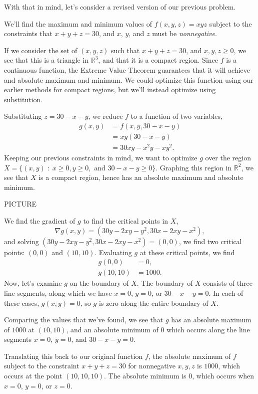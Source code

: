 \documentclass{ximera}
\begin{document}
With that in mind, let's consider a revised version of our previous problem.

\begin{example}
We'll find the maximum and minimum values of $f(x,y,z) = xyz$ subject to the constraints that $x+y+z=30$, and $x$, $y$, and $z$ must be \emph{nonnegative}.

If we consider the set of $(x,y,z)$ such that $x+y+z=30$, and $x,y,z\geq 0$, we see that this is a triangle in $\mathbb{R}^3$, and that it is a compact region. Since $f$ is a continuous function, the Extreme Value Theorem guarantees that it will achieve and absolute maximum and minimum. We could optimize this function using our earlier methods for compact regions, but we'll instead optimize using substitution.

Substituting $z = 30-x-y$, we reduce $f$ to a function of two variables,
\begin{align*}
g(x,y) &= f(x,y,30-x-y)\\
&= xy(30-x-y)\\
&= 30xy-x^2y-xy^2.
\end{align*}
Keeping our previous constraints in mind, we want to optimize $g$ over the region $X = \{(x,y)\;:\;x\geq 0, y\geq 0, \text{ and } 30-x-y\geq 0\}$. Graphing this region in $\mathbb{R}^2$, we see that $X$ is a compact region, hence has an absolute maximum and absolute minimum.

PICTURE

We find the gradient of $g$ to find the critical points in $X$,
\[
\nabla g(x,y) = (30y-2xy-y^2, 30x-2xy-x^2),
\]
and solving $(30y-2xy-y^2, 30x-2xy-x^2) = (0,0)$, we find two critical points: $(0,0)$ and $(10,10)$. Evaluating $g$ at these critical points, we find
\begin{align*}
g(0,0) &= 0,\\
g(10,10) &= 1000.
\end{align*}
Now, let's examine $g$ on the boundary of $X$. The boundary of $X$ consists of three line segments, along which we have $x = 0$, $y=0$, or $30-x-y=0$. In each of these cases, $g(x,y) = 0$, so $g$ is zero along the entire boundary of $X$.

Comparing the values that we've found, we see that $g$ has an absolute maximum of $1000$ at $(10,10)$, and an absolute minimum of $0$ which occurs along the line segments $x=0$, $y=0$, and $30-x-y=0$.

Translating this back to our original function $f$, the absolute maximum of $f$ subject to the constraint $x+y+z=30$ for nonnegative $x,y,z$ is $1000$, which occurs at the point $(10,10,10)$. The absolute minimum is $0$, which occurs when $x=0$, $y=0$, or $z=0$.

\end{example}
\end{document}
